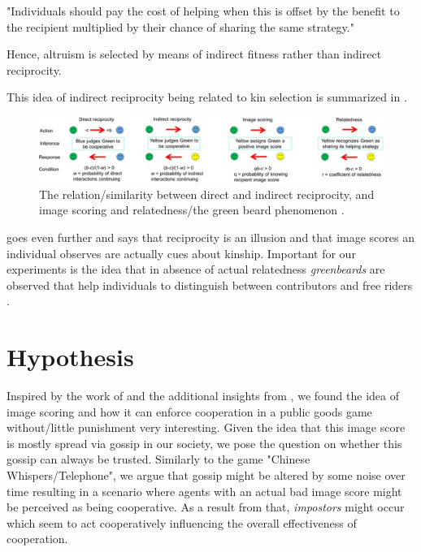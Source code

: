 \documentclass[sigconf]{acmart}
\newcommand{\impostors}{\textit{impostors}\xspace}
\newcommand{\greenbeards}{\textit{greenbeards}\xspace}
\begin{document}
    "Individuals should pay the cost of helping when this is offset by the benefit to the recipient multiplied by their chance of sharing the same strategy." \cite{roberts_kin_2019}

    Hence, altruism is selected by means of indirect fitness rather than indirect reciprocity.

    This idea of indirect reciprocity being related to kin selection is summarized in .

    \begin{figure}
        \includegraphics[width=\textwidth]{figures/indirect_reciprocity}
        \caption{The relation/similarity between direct and indirect reciprocity, and image scoring and relatedness/the green beard phenomenon \cite{roberts_kin_2019}.}
        \label{fig:indirect_reciprocity}
    \end{figure}

    \citeauthor{roberts_kin_2019} goes even further and says that reciprocity is an illusion and that image scores an individual observes are actually cues about kinship.
    Important for our experiments is the idea that in absence of actual relatedness \greenbeards are observed that help individuals to distinguish between contributors and free riders \cite{roberts_kin_2019}.


    \section{Hypothesis}\label{sec:hypothesis}
    Inspired by the work of \citeauthor{milinski_cooperation_2002} \cite{milinski_cooperation_2002} and the additional insights from \citeauthor{roberts_kin_2019} \cite{roberts_kin_2019}, we found the idea of image scoring and how it can enforce cooperation in a public goods game without/little punishment very interesting.
    Given the idea that this image score is mostly spread via gossip in our society, we pose the question on whether this gossip can always be trusted.
    Similarly to the game "Chinese Whispers/Telephone", we argue that gossip might be altered by some noise over time resulting in a scenario where agents with an actual bad image score might be perceived as being cooperative.
    As a result from that, \impostors might occur which seem to act cooperatively influencing the overall effectiveness of cooperation.
\end{document}
